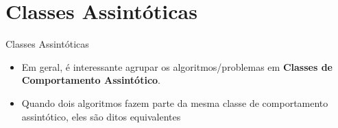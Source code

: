 \documentclass[aspectratio=169]{beamer}
\begin{document}
%
%
%
%
%
\section{Classes Assintóticas}

\begin{frame}{Classes Assintóticas}
\begin{itemize}
 \item Em geral, é interessante agrupar os algoritmos/problemas em {\bf Classes de Comportamento Assintótico}.
 \item Quando dois algoritmos fazem parte da mesma classe de comportamento assintótico, eles são ditos equivalentes
 
\end{itemize}
\end{frame}
\end{document}
